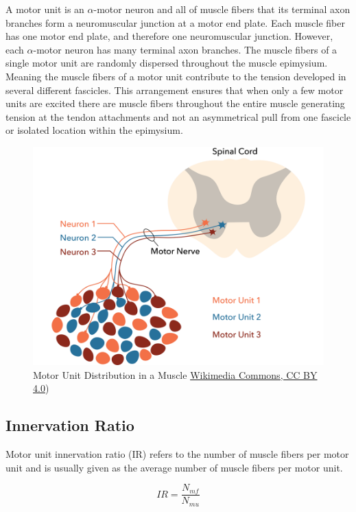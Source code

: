 A motor unit is an $\alpha$-motor neuron and all of muscle fibers that its terminal axon branches form a neuromuscular junction at a motor end plate. Each muscle fiber has one motor end plate, and therefore one neuromuscular junction. However, each $\alpha$-motor neuron has many terminal axon branches. The muscle fibers of a single motor unit are randomly dispersed throughout the muscle epimysium. Meaning the muscle fibers of a motor unit contribute to the tension developed in several different fascicles. This arrangement ensures that when only a few motor units are excited there are muscle fibers throughout the entire muscle generating tension at the tendon attachments and not an asymmetrical pull from one fascicle or isolated location within the epimysium.

\begin{figure}[!ht]
    \centering
    \includegraphics[width=1\linewidth]{./figure/motor_unit.png}
    \caption{Motor Unit Distribution in a Muscle \footnotesize{\href{https://commons.wikimedia.org/wiki/File:Motor_unit.png}{Wikimedia Commons, CC BY 4.0})}}
    \label{fig:motor_unit}
\end{figure}

\subsection{Innervation Ratio}
Motor unit innervation ratio (IR) refers to the number of muscle fibers per motor unit and is usually given as the average number of muscle fibers per motor unit.

\begin{equation}
    IR = \frac{N_{mf}}{N_{mu}}
\end{equation}

